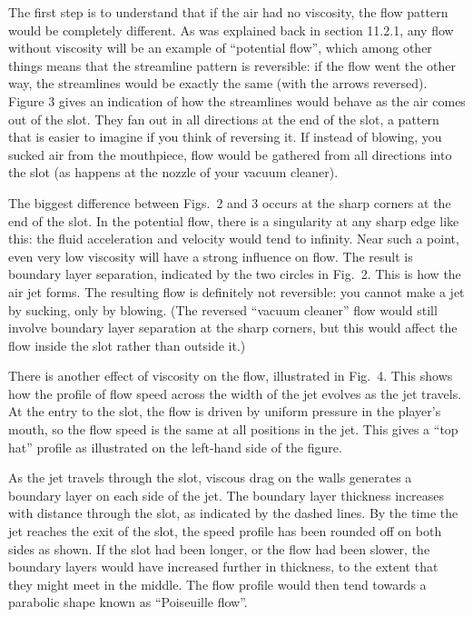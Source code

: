   The first step is to understand that if the air had no viscosity, the flow 
  pattern would be completely different. As was explained back in section 
  11.2.1, any flow without viscosity will be an example of ``potential flow'', 
  which among other things means that the streamline pattern is reversible: if 
  the flow went the other way, the streamlines would be exactly the same (with 
  the arrows reversed). Figure 3 gives an indication of how the streamlines 
  would behave as the air comes out of the slot. They fan out in all directions 
  at the end of the slot, a pattern that is easier to imagine if you think of 
  reversing it. If instead of blowing, you sucked air from the mouthpiece, flow 
  would be gathered from all directions into the slot (as happens at the nozzle 
  of your vacuum cleaner). 

  The biggest difference between Figs.\ 2 and 3 occurs at the sharp corners at 
  the end of the slot. In the potential flow, there is a singularity at any 
  sharp edge like this: the fluid acceleration and velocity would tend to 
  infinity. Near such a point, even very low viscosity will have a strong 
  influence on flow. The result is boundary layer separation, indicated by the 
  two circles in Fig.\ 2. This is how the air jet forms. The resulting flow is 
  definitely not reversible: you cannot make a jet by sucking, only by blowing. 
  (The reversed ``vacuum cleaner'' flow would still involve boundary layer 
  separation at the sharp corners, but this would affect the flow inside the 
  slot rather than outside it.) 

  There is another effect of viscosity on the flow, illustrated in Fig.\ 4. 
  This shows how the profile of flow speed across the width of the jet evolves 
  as the jet travels. At the entry to the slot, the flow is driven by uniform 
  pressure in the player's mouth, so the flow speed is the same at all 
  positions in the jet. This gives a ``top hat'' profile as illustrated on the 
  left-hand side of the figure. 

  As the jet travels through the slot, viscous drag on the walls generates a 
  boundary layer on each side of the jet. The boundary layer thickness 
  increases with distance through the slot, as indicated by the dashed lines. 
  By the time the jet reaches the exit of the slot, the speed profile has been 
  rounded off on both sides as shown. If the slot had been longer, or the flow 
  had been slower, the boundary layers would have increased further in 
  thickness, to the extent that they might meet in the middle. The flow profile 
  would then tend towards a parabolic shape known as ``Poiseuille flow''. 

